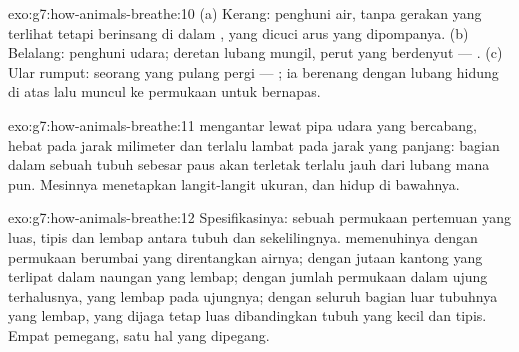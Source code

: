 \begin{solution}{exo:g7:how-animals-breathe:10}
(a) Kerang: penghuni air, tanpa gerakan yang terlihat tetapi
berinsang di dalam , yang dicuci arus yang dipompanya. (b)
Belalang: penghuni udara; deretan lubang mungil, perut yang berdenyut
--- . (c) Ular rumput: seorang  yang pulang pergi ---
; ia berenang dengan lubang hidung di atas lalu muncul ke
permukaan untuk bernapas.
\end{solution}

\begin{solution}{exo:g7:how-animals-breathe:11}
 mengantar lewat pipa udara yang bercabang, hebat pada jarak
milimeter dan terlalu lambat pada jarak yang panjang: bagian dalam
sebuah tubuh sebesar paus akan terletak terlalu jauh dari lubang mana
pun. Mesinnya menetapkan langit-langit ukuran, dan  hidup di
bawahnya.
\end{solution}

\begin{solution}{exo:g7:how-animals-breathe:12}
Spesifikasinya: sebuah permukaan pertemuan yang luas, tipis dan lembap
antara tubuh dan sekelilingnya.  memenuhinya dengan permukaan
berumbai yang direntangkan airnya;  dengan jutaan kantong
yang terlipat dalam naungan yang lembap;  dengan jumlah
permukaan dalam ujung terhalusnya, yang lembap pada ujungnya; 
dengan seluruh bagian luar tubuhnya yang lembap, yang dijaga tetap
luas dibandingkan tubuh yang kecil dan tipis. Empat pemegang, satu hal
yang dipegang.
\end{solution}

